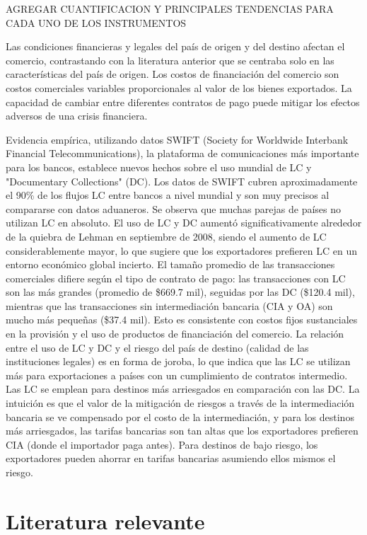 \documentclass[11pt]{article}
\begin{document}
AGREGAR CUANTIFICACION Y PRINCIPALES TENDENCIAS PARA CADA UNO DE LOS INSTRUMENTOS 



Las condiciones financieras y legales del país de origen y del destino afectan el comercio, contrastando con la literatura anterior que se centraba solo en las características del país de origen. Los costos de financiación del comercio son costos comerciales variables proporcionales al valor de los bienes exportados. La capacidad de cambiar entre diferentes contratos de pago puede mitigar los efectos adversos de una crisis financiera.

Evidencia empírica, \citet{Niepmann2017} utilizando datos SWIFT (Society for Worldwide Interbank Financial Telecommunications), la plataforma de comunicaciones más importante para los bancos, establece nuevos hechos sobre el uso mundial de LC y "Documentary Collections" (DC). Los datos de SWIFT cubren aproximadamente el 90\% de los flujos LC entre bancos a nivel mundial y son muy precisos al compararse con datos aduaneros. Se observa que muchas parejas de países no utilizan LC en absoluto. El uso de LC y DC aumentó significativamente alrededor de la quiebra de Lehman en septiembre de 2008, siendo el aumento de LC considerablemente mayor, lo que sugiere que los exportadores prefieren LC en un entorno económico global incierto.
El tamaño promedio de las transacciones comerciales difiere según el tipo de contrato de pago: las transacciones con LC son las más grandes (promedio de \$669.7 mil), seguidas por las DC (\$120.4 mil), mientras que las transacciones sin intermediación bancaria (CIA y OA) son mucho más pequeñas (\$37.4 mil). Esto es consistente con costos fijos sustanciales en la provisión y el uso de productos de financiación del comercio. La relación entre el uso de LC y DC y el riesgo del país de destino (calidad de las instituciones legales) es en forma de joroba, lo que indica que las LC se utilizan más para exportaciones a países con un cumplimiento de contratos intermedio. Las LC se emplean para destinos más arriesgados en comparación con las DC. La intuición es que el valor de la mitigación de riesgos a través de la intermediación bancaria se ve compensado por el costo de la intermediación, y para los destinos más arriesgados, las tarifas bancarias son tan altas que los exportadores prefieren CIA (donde el importador paga antes). Para destinos de bajo riesgo, los exportadores pueden ahorrar en tarifas bancarias asumiendo ellos mismos el riesgo.

\section*{Literatura relevante}
\end{document}
